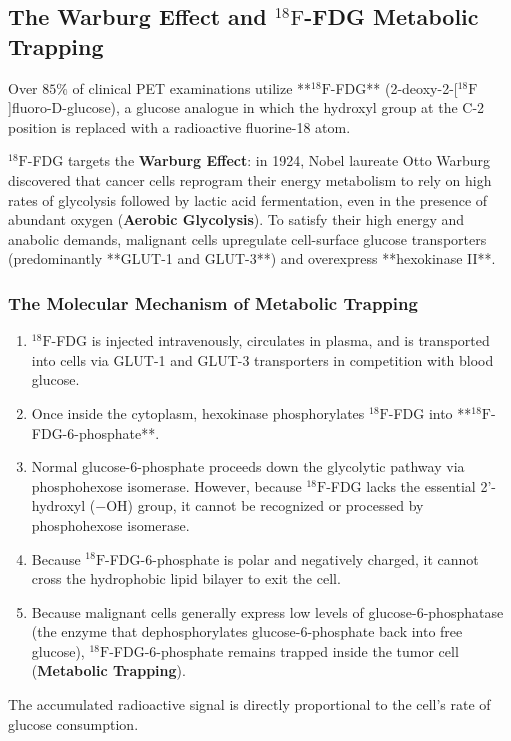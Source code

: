 \documentclass[11pt,a4paper]{article}
\begin{document}
\subsection{The Warburg Effect and $^{18}\text{F}$-FDG Metabolic Trapping}
Over $85\%$ of clinical PET examinations utilize **$^{18}\text{F}$-FDG** (2-deoxy-2-[$^{18}\text{F}$]fluoro-D-glucose), a glucose analogue in which the hydroxyl group at the C-2 position is replaced with a radioactive fluorine-18 atom.

$^{18}\text{F}$-FDG targets the \textbf{Warburg Effect}: in 1924, Nobel laureate Otto Warburg discovered that cancer cells reprogram their energy metabolism to rely on high rates of glycolysis followed by lactic acid fermentation, even in the presence of abundant oxygen (\textbf{Aerobic Glycolysis}). To satisfy their high energy and anabolic demands, malignant cells upregulate cell-surface glucose transporters (predominantly **GLUT-1 and GLUT-3**) and overexpress **hexokinase II**.

\subsubsection{The Molecular Mechanism of Metabolic Trapping}
\begin{enumerate}
    \item $^{18}\text{F}$-FDG is injected intravenously, circulates in plasma, and is transported into cells via GLUT-1 and GLUT-3 transporters in competition with blood glucose.
    \item Once inside the cytoplasm, hexokinase phosphorylates $^{18}\text{F}$-FDG into **$^{18}\text{F}$-FDG-6-phosphate**.
    \item Normal glucose-6-phosphate proceeds down the glycolytic pathway via phosphohexose isomerase. However, because $^{18}\text{F}$-FDG lacks the essential 2'-hydroxyl ($-\text{OH}$) group, it cannot be recognized or processed by phosphohexose isomerase.
    \item Because $^{18}\text{F}$-FDG-6-phosphate is polar and negatively charged, it cannot cross the hydrophobic lipid bilayer to exit the cell.
    \item Because malignant cells generally express low levels of glucose-6-phosphatase (the enzyme that dephosphorylates glucose-6-phosphate back into free glucose), $^{18}\text{F}$-FDG-6-phosphate remains trapped inside the tumor cell (\textbf{Metabolic Trapping}).
\end{enumerate}
The accumulated radioactive signal is directly proportional to the cell's rate of glucose consumption.
\end{document}
